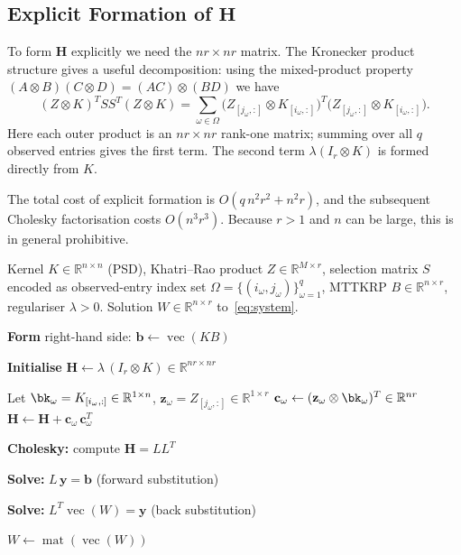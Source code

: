 \documentclass[12pt]{article}
\theoremstyle{definition}
\DeclareMathOperator{\vecop}{vec}
\DeclareMathOperator{\mat}{mat}
\newcommand{\R}{\mathbb{R}}
\newcommand{\bH}{\mathbf{H}}
\newcommand{\bz}{\mathbf{z}}
\begin{document}
\subsection{Explicit Formation of $\bH$}

To form $\bH$ explicitly we need the $nr\times nr$ matrix.  The Kronecker product
structure gives a useful decomposition: using the mixed-product property
$(A\otimes B)(C\otimes D)=(AC)\otimes(BD)$ we have
\begin{equation}
  (Z\otimes K)^T S S^T (Z\otimes K)
  = \sum_{\omega\in\Omega}
    \bigl(Z_{[j_\omega,:]}\otimes K_{[i_\omega,:]}\bigr)^T
    \bigl(Z_{[j_\omega,:]}\otimes K_{[i_\omega,:]}\bigr).
\end{equation}
Here each outer product is an $nr\times nr$ rank-one matrix; summing over all
$q$ observed entries gives the first term.  The second term $\lambda(I_r\otimes
K)$ is formed directly from $K$.

The total cost of explicit formation is $O(q\,n^2r^2 + n^2r)$, and the
subsequent Cholesky factorisation costs $O(n^3r^3)$.  Because $r>1$ and $n$ can
be large, this is in general prohibitive.

\begin{algorithm}[H]
\caption{Direct Symmetric Solve for the Mode-$k$ RKHS-CP Subproblem}
\label{alg:direct}
\begin{algorithmic}[1]
\Require Kernel $K\in\R^{n\times n}$ (PSD), Khatri--Rao product
         $Z\in\R^{M\times r}$, selection matrix $S$ encoded as observed-entry
         index set $\Omega=\{(i_\omega,j_\omega)\}_{\omega=1}^q$,
         MTTKRP $B\in\R^{n\times r}$, regulariser $\lambda>0$.
\Ensure  Solution $W\in\R^{n\times r}$ to~\eqref{eq:system}.

\State \textbf{Form} right-hand side: $\mathbf{b} \gets \vecop(KB)$

\State \textbf{Initialise} $\bH \gets \lambda\,(I_r\otimes K) \in \R^{nr\times nr}$

  \State Let $\bk_\omega = K_{[i_\omega,:]}\in\R^{1\times n}$,\;
               $\bz_\omega = Z_{[j_\omega,:]}\in\R^{1\times r}$
  \State $\mathbf{c}_\omega \gets (\bz_\omega \otimes \bk_\omega)^T \in \R^{nr}$
  \State $\bH \gets \bH + \mathbf{c}_\omega\,\mathbf{c}_\omega^T$
\EndFor
{}

\State \textbf{Cholesky:} compute $\bH = LL^T$

\State \textbf{Solve:} $L\,\mathbf{y} = \mathbf{b}$ (forward substitution)

\State \textbf{Solve:} $L^T\vecop(W) = \mathbf{y}$ (back substitution)

\State \Return $W \gets \mat(\vecop(W))$
\end{algorithmic}
\end{algorithm}
\end{document}
